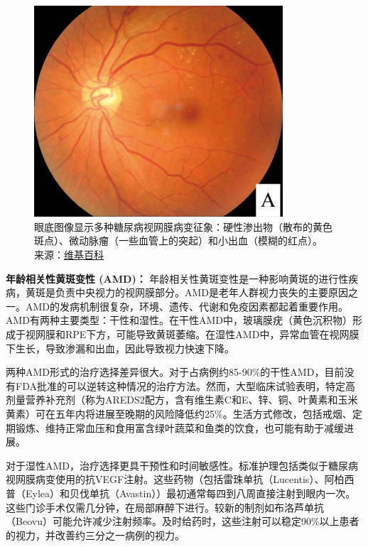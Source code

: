 \documentclass[
  Letterpaper,
]{scrbook}
\begin{document}
\begin{figure}[H]

{\centering \includegraphics[width=3.64583in,height=\textheight,keepaspectratio]{_resources/images/pathologies/Fundus_-_diabetic_retinopathy.png}

}

\caption{眼底图像显示多种糖尿病视网膜病变征象：硬性渗出物（散布的黄色斑点）、微动脉瘤（一些血管上的突起）和小出血（模糊的红点）。\\
来源：\href{https://en.wikipedia.org/wiki/Diabetic_retinopathy}{维基百科}}

\end{figure}%

\textbf{年龄相关性黄斑变性 (AMD)：}
年龄相关性黄斑变性是一种影响黄斑的进行性疾病，黄斑是负责中央视力的视网膜部分。AMD是老年人群视力丧失的主要原因之一。AMD的发病机制很复杂，环境、遗传、代谢和免疫因素都起着重要作用。AMD有两种主要类型：干性和湿性。在干性AMD中，玻璃膜疣（黄色沉积物）形成于视网膜和RPE下方，可能导致黄斑萎缩。在湿性AMD中，异常血管在视网膜下生长，导致渗漏和出血，因此导致视力快速下降。

两种AMD形式的治疗选择差异很大。对于占病例约85-90\%的干性AMD，目前没有FDA批准的可以逆转这种情况的治疗方法。然而，大型临床试验表明，特定高剂量营养补充剂（称为AREDS2配方，含有维生素C和E、锌、铜、叶黄素和玉米黄素）可在五年内将进展至晚期的风险降低约25\%。生活方式修改，包括戒烟、定期锻炼、维持正常血压和食用富含绿叶蔬菜和鱼类的饮食，也可能有助于减缓进展。

对于湿性AMD，治疗选择更具干预性和时间敏感性。标准护理包括类似于糖尿病视网膜病变使用的抗VEGF注射。这些药物（包括雷珠单抗（Lucentis）、阿柏西普（Eylea）和贝伐单抗（Avastin））最初通常每四到八周直接注射到眼内一次。这些门诊手术仅需几分钟，在局部麻醉下进行。较新的制剂如布洛芦单抗（Beovu）可能允许减少注射频率。及时给药时，这些注射可以稳定90\%以上患者的视力，并改善约三分之一病例的视力。
\end{document}
